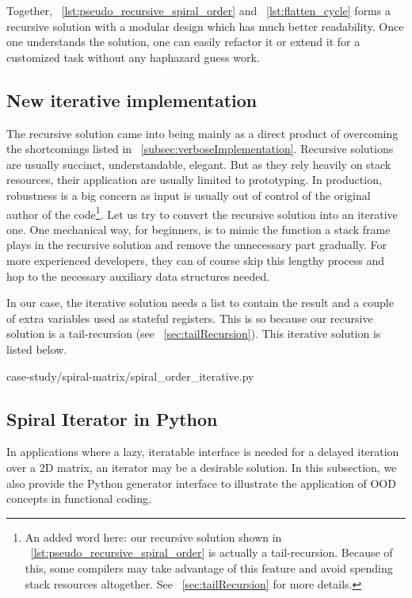 \documentclass[oneside,11pt]{book}
\theoremstyle{definition}
\theoremstyle{remark}
\newcommand{\python}{Python }
\begin{document}
Together, ~\autoref{lst:pseudo_recursive_spiral_order} and ~\autoref{lst:flatten_cycle}
forms a recursive solution with a modular design which has much better readability.
Once one understands the solution, one can easily refactor it or extend it for a customized task
without any haphazard guess work.


\subsection{New iterative implementation}\label{subsec:newIterative.spiralMatrix}

The recursive solution came into being mainly as a direct product of overcoming the shortcomings
listed in ~\autoref{subsec:verboseImplementation}.
Recursive solutions are usually succinct, understandable, elegant.
But as they rely heavily on stack resources, their application are usually limited to prototyping.
In production, robustness is a big concern as input is usually out of control of the original
author of the code\footnote{An added word here: our recursive solution shown in
~\autoref{lst:pseudo_recursive_spiral_order} is actually a tail-recursion.
Because of this, some compilers may take advantage of this feature and avoid spending stack
resources altogether.
See ~\autoref{sec:tailRecursion} for more details.}.
Let us try to convert the recursive solution into an iterative one.
One mechanical way, for beginners, is to mimic the function a stack frame plays in the recursive
solution and remove the unnecessary part gradually.
For more experienced developers, they can of course skip this lengthy process and hop to the
necessary auxiliary data structures needed.

In our case, the iterative solution needs a list to contain the result and a couple of extra
variables used as stateful registers.
This is so because our recursive solution is a tail-recursion (see ~\autoref{sec:tailRecursion}).
This iterative solution is listed below.

{case-study/spiral-matrix/spiral_order_iterative.py}

\subsection{Spiral Iterator in \python}\label{subsec:spiralIterator}

In applications where a lazy, iteratable interface is needed for a delayed iteration over a $2$D
matrix, an iterator may be a desirable solution.
In this subsection, we also provide the \python generator interface to illustrate the application
of OOD concepts in functional coding.
\end{document}
